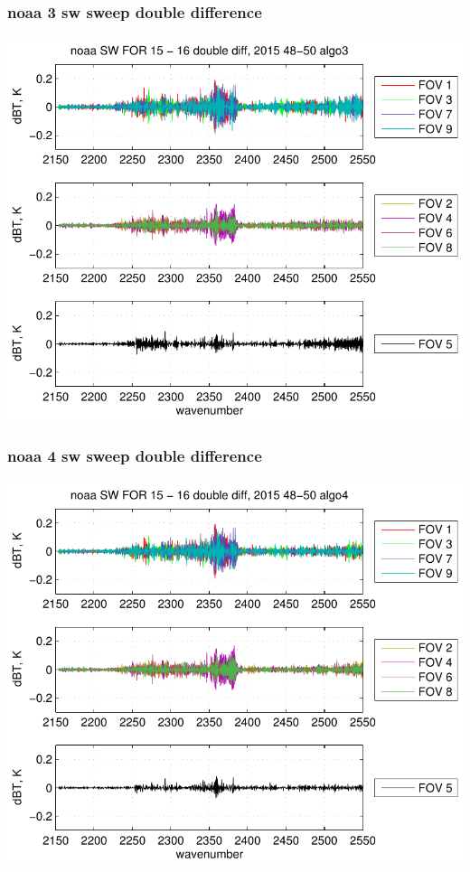 \documentclass[11pt]{beamer}
\begin{document}
\begin{frame}
\frametitle{noaa 3 sw sweep double difference}
\begin{center}
  \includegraphics[scale=0.7]{figures/noaa_SW_sfil_2015_48-50_algo3.pdf}
\end{center}
\end{frame}
\begin{frame}
\frametitle{noaa 4 sw sweep double difference}
\begin{center}
  \includegraphics[scale=0.7]{figures/noaa_SW_sfil_2015_48-50_algo4.pdf}
\end{center}
\end{frame}
\end{document}
